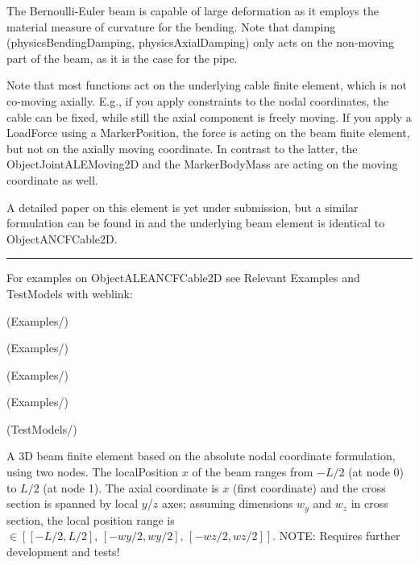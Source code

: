     The Bernoulli-Euler beam is capable of large deformation as it employs the material measure of curvature for the bending.
    Note that damping (physicsBendingDamping, physicsAxialDamping) only acts on the non-moving part of the beam, as it is the case for the pipe.
    
    Note that most functions act on the underlying cable finite element, which is not co-moving axially. E.g., if you apply constraints
    to the nodal coordinates, the cable can be fixed, while still the axial component is freely moving.
    If you apply a LoadForce using a MarkerPosition, the force is acting on the beam finite element, but not on the axially moving coordinate.
    In contrast to the latter, the ObjectJointALEMoving2D and the MarkerBodyMass are acting on the moving coordinate as well.

    A detailed paper on this element is yet under submission, but a similar formulation can be found in \cite{PechsteinGerstmayr2013ale} and 
    the underlying beam element is identical to ObjectANCFCable2D.
\vspace{6pt}\par\noindent\rule{\textwidth}{0.4pt}
%
\noindent For examples on ObjectALEANCFCable2D see Relevant Examples and TestModels with weblink:
\bi
\item {} (Examples/)
\item {} (Examples/)
\item {} (Examples/)
\item {} (Examples/)
\item {} (TestModels/)

\ei

%
\newpage


\label{sec:item:ObjectANCFBeam}
A 3D beam finite element based on the absolute nodal coordinate formulation, using two nodes. The localPosition $x$ of the beam ranges from $-L/2$ (at node 0) to $L/2$ (at node 1). The axial coordinate is $x$ (first coordinate) and the cross section is spanned by local $y$/$z$ axes; assuming dimensions $w_y$ and $w_z$ in cross section, the local position range is $\in [[-L/2,L/2],\, [-wy/2,wy/2],\, [-wz/2,wz/2] ]$. NOTE: Requires further development and tests!
\vspace{12pt}\\


